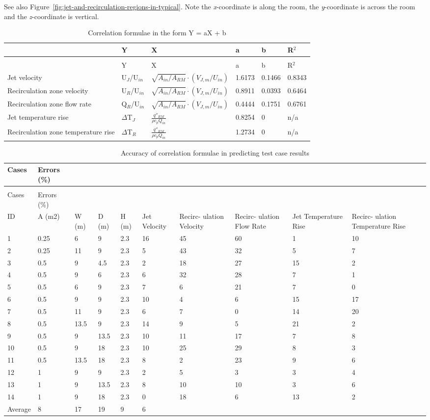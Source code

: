 See also Figure~\ref{fig:jet-and-recirculation-regions-in-typical}. Note the \emph{x}-coordinate is along the room, the \emph{y}-coordinate is across the room and the \emph{z}-coordinate is vertical.

\begin{longtable}[c]{p{1.0in}p{0.5in}p{2.0in}p{0.5in}p{0.5in}p{0.5in}}
\caption{Correlation formulae in the form Y = aX + b \label{table:correlation-formulae-in-the-form-y-ax-+-b}} \tabularnewline
\toprule
~ & Y & X & a & b & R\(^2\) \tabularnewline
\midrule
\endfirsthead

\caption[]{Correlation formulae in the form Y = aX + b} \tabularnewline
\toprule
~ & Y & X & a & b & R\(^2\) \tabularnewline
\midrule
\endhead
Jet velocity & U\(_J\)/U\(_{in}\) & $\sqrt{A_{in}/A_{RM}} \cdot \left(V_{J,m}/U_{in}\right)$ & 1.6173 & 0.1466 & 0.8343 \tabularnewline
Recirculation zone velocity & U\(_R\)/U\(_{in}\) & $\sqrt{A_{in}/A_{RM}} \cdot \left(V_{J,m}/U_{in}\right)$ & 0.8911 & 0.0393 & 0.6464 \tabularnewline
Recirculation zone flow rate & Q\(_R\)/U\(_{in}\) & $\sqrt{A_{in}/A_{RM}} \cdot \left(V_{J,m}/U_{in}\right)$ & 0.4444 & 0.1751 & 0.6761 \tabularnewline
Jet temperature rise & $\Delta$T\(_J\) & $\frac{q''_{RM}}{\rho {c_p}{Q_{in}}}$ & 0.8254 & 0 & n/a \tabularnewline
Recirculation zone temperature rise & $\Delta$T\(_R\) & $\frac{q''_{RM}}{\rho {c_p}{Q_{in}}}$ & 1.2734 & 0 & n/a \tabularnewline
\bottomrule
\end{longtable}

\begin{longtable}[c]{p{0.5in}p{0.4in}p{0.4in}p{0.4in}p{0.4in}p{0.4in}p{0.6in}p{0.6in}p{0.6in}p{0.6in}}
\caption{Accuracy of correlation formulae in predicting test case results \label{table:accuracy-of-correlation-formulae-in}} \tabularnewline
\toprule
Cases & Errors (\%) \tabularnewline
\midrule
\endfirsthead

\caption[]{Accuracy of correlation formulae in predicting test case results} \tabularnewline
\toprule
Cases & Errors (\%) \tabularnewline
\midrule
\endhead

ID & A (m2) & W (m) & D (m) & H (m) & Jet Velocity & Recirc- ulation Velocity & Recirc- ulation Flow Rate & Jet Temperature Rise & Recirc- ulation Temperature Rise \tabularnewline
1 & 0.25 & 6 & 9 & 2.3 & 16 & 45 & 60 & 1 & 10 \tabularnewline
2 & 0.25 & 11 & 9 & 2.3 & 5 & 43 & 32 & 5 & 7 \tabularnewline
3 & 0.5 & 9 & 4.5 & 2.3 & 2 & 18 & 27 & 15 & 2 \tabularnewline
4 & 0.5 & 9 & 6 & 2.3 & 6 & 32 & 28 & 7 & 1 \tabularnewline
5 & 0.5 & 6 & 9 & 2.3 & 7 & 6 & 21 & 7 & 0 \tabularnewline
6 & 0.5 & 9 & 9 & 2.3 & 10 & 4 & 6 & 15 & 17 \tabularnewline
7 & 0.5 & 11 & 9 & 2.3 & 6 & 7 & 0 & 14 & 20 \tabularnewline
8 & 0.5 & 13.5 & 9 & 2.3 & 14 & 9 & 5 & 21 & 2 \tabularnewline
9 & 0.5 & 9 & 13.5 & 2.3 & 10 & 11 & 17 & 7 & 8 \tabularnewline
10 & 0.5 & 9 & 18 & 2.3 & 10 & 25 & 29 & 8 & 3 \tabularnewline
11 & 0.5 & 13.5 & 18 & 2.3 & 8 & 2 & 23 & 9 & 6 \tabularnewline
12 & 1 & 9 & 9 & 2.3 & 2 & 5 & 3 & 3 & 4 \tabularnewline
13 & 1 & 9 & 13.5 & 2.3 & 8 & 10 & 10 & 3 & 6 \tabularnewline
14 & 1 & 9 & 18 & 2.3 & 0 & 18 & 6 & 13 & 2 \tabularnewline
Average & 8 & 17 & 19 & 9 & 6 \tabularnewline
\bottomrule
\end{longtable}

